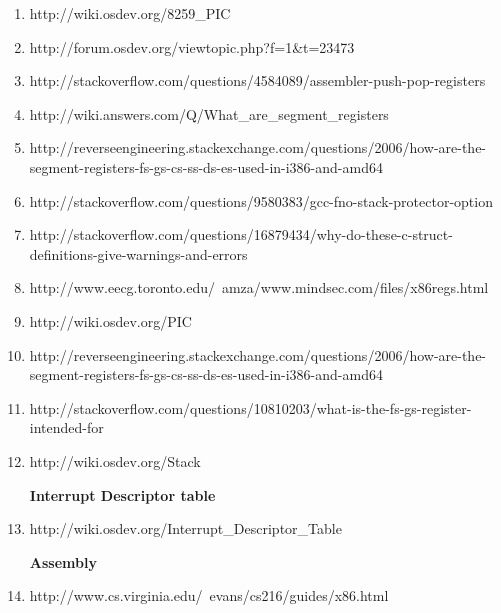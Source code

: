 \documentclass[11pt]{article}
\begin{document}
\begin{enumerate}
  \item  {http://wiki.osdev.org/8259\_PIC}
  
  \item  {http://forum.osdev.org/viewtopic.php?f=1\&t=23473}
  
  \item  {http://stackoverflow.com/questions/4584089/assembler-push-pop-registers}
  
 \item   {http://wiki.answers.com/Q/What\_are\_segment\_registers}
 
 \item   {http://reverseengineering.stackexchange.com/questions/2006/how-are-the-segment-registers-fs-gs-cs-ss-ds-es-used-in-i386-and-amd64}
 
 \item  {http://stackoverflow.com/questions/9580383/gcc-fno-stack-protector-option}
 
 \item  {http://stackoverflow.com/questions/16879434/why-do-these-c-struct-definitions-give-warnings-and-errors}
 
 \item  {http://www.eecg.toronto.edu/~amza/www.mindsec.com/files/x86regs.html}
 
 \item  {http://wiki.osdev.org/PIC}
 
 \item  {http://reverseengineering.stackexchange.com/questions/2006/how-are-the-segment-registers-fs-gs-cs-ss-ds-es-used-in-i386-and-amd64}
 
 \item  {http://stackoverflow.com/questions/10810203/what-is-the-fs-gs-register-intended-for}
 
 \item  {http://wiki.osdev.org/Stack}
 
 

      \vspace {3 mm}
  
  \textbf{ Interrupt Descriptor table }
  

  
  \item  {http://wiki.osdev.org/Interrupt\_Descriptor\_Table}
  
      \vspace {3 mm}
  
  \textbf{ Assembly }
  
  \item  {http://www.cs.virginia.edu/~evans/cs216/guides/x86.html}
  

\end{enumerate}
\end{document}

